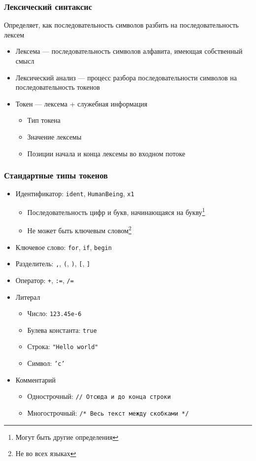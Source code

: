 \documentclass{beamer}
\begin{document}
\begin{frame}[fragile]
  \transwipe[direction=90]
  \frametitle{Лексический синтаксис}
  \begin{center}
Определяет, как последовательность символов разбить на последовательность лексем
  \end{center}

\begin{itemize}
  \item Лексема --- последовательность символов алфавита, имеющая собственный смысл
  \item Лексический анализ --- процесс разбора последовательности символов на последовательность токенов
  \item Токен --- лексема + служебная информация
  \begin{itemize}
    \item Тип токена
    \item Значение лексемы
    \item Позиции начала и конца лексемы во входном потоке
  \end{itemize}
\end{itemize}
\end{frame}



\begin{frame}[fragile]
  \transwipe[direction=90]
  \frametitle{Стандартные типы токенов}
\begin{itemize}
  \item Идентификатор: \texttt{ident}, \texttt{HumanBeing}, \texttt{x1}
  \begin{itemize}
    \item Последовательность цифр и букв, начинающаяся на букву\footnote{Могут быть другие определения}
    \item Не может быть ключевым словом\footnote{Не во всех языках    }
  \end{itemize}
  \item Ключевое слово: \texttt{for}, \texttt{if}, \texttt{begin}
  \item Разделитель: \texttt{,}, \texttt{(}, \texttt{)}, \texttt{[}, \texttt{]}
  \item Оператор: \texttt{+}, \texttt{:=}, \texttt{/=}
  \item Литерал
  \begin{itemize}
    \item Число: \texttt{123.45e-6}
    \item Булева константа: \texttt{true}
    \item Строка: \texttt{"Hello world"}
    \item Символ: \texttt{'c'}
  \end{itemize}
  \item Комментарий
  \begin{itemize}
    \item Однострочный: \texttt{// Отсюда и до конца строки}
    \item Многострочный: \texttt{/* Весь текст между скобками */}
  \end{itemize}
\end{itemize}
\end{frame}
\end{document}
